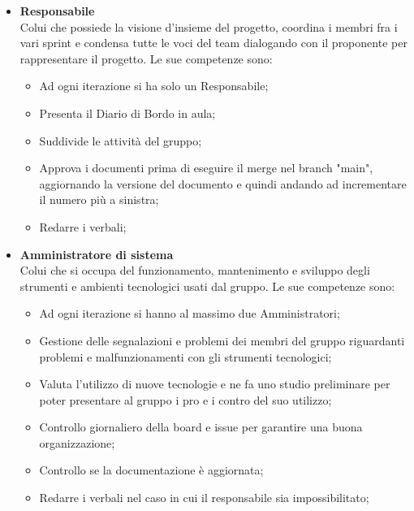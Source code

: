             \begin{itemize}
                \item \textbf{Responsabile}\\
                Colui che possiede la visione d'insieme del progetto, coordina i membri fra i vari sprint e condensa tutte le voci del team
                dialogando con il proponente per rappresentare il progetto.
                Le sue competenze sono:
                \begin{itemize}
                    \item Ad ogni iterazione si ha solo un Responsabile;
                    \item Presenta il Diario di Bordo in aula;
                    \item Suddivide le attività del gruppo;
                    \item Approva i documenti prima di eseguire il merge nel branch "main", aggiornando la versione del documento e quindi andando ad incrementare il numero più a sinistra;
                    \item Redarre i verbali;
                \end{itemize}
                \item \textbf{Amministratore di sistema}\\
                Colui che si occupa del funzionamento, mantenimento e sviluppo degli strumenti e ambienti tecnologici
                usati dal gruppo.
                Le sue competenze sono:
                \begin{itemize}
                    \item Ad ogni iterazione si hanno al massimo due Amministratori;
                    \item Gestione delle segnalazioni e problemi dei membri del gruppo riguardanti problemi e malfunzionamenti
                    con gli strumenti tecnologici;
                    \item Valuta l'utilizzo di nuove tecnologie e ne fa uno studio preliminare per poter presentare al
                        gruppo i pro e i contro del suo utilizzo;
                    \item Controllo giornaliero della board e issue per garantire una buona organizzazione;
                    \item Controllo se la documentazione è aggiornata;
                    \item Redarre i verbali nel caso in cui il responsabile sia impossibilitato;
                    \end{itemize}

\end{itemize}
